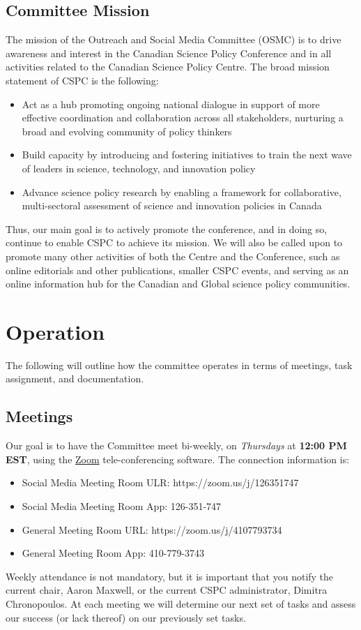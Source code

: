 \documentclass[11pt]{amsart}
\newcommand{\currentChair}{Aaron Maxwell}
\newcommand{\currentAdmin}{Dimitra Chronopoulos}
\begin{document}
\subsection{Committee Mission}
The mission of the Outreach and Social Media Committee (OSMC) is to drive awareness and interest in the Canadian Science Policy Conference and in all activities related to the Canadian Science Policy Centre.
The broad mission statement of CSPC is the following:
\begin{itemize}
\item Act as a hub promoting ongoing national dialogue in support of more effective coordination and collaboration across all stakeholders, nurturing a broad and evolving community of policy thinkers
\item Build capacity by introducing and fostering initiatives to train the next wave of leaders in science, technology, and innovation policy
\item Advance science policy research by enabling a framework for collaborative, multi-sectoral assessment of science and innovation policies in Canada
\end{itemize}
Thus, our main goal is to actively promote the conference, and in doing so, continue to enable CSPC to achieve its mission.
We will also be called upon to promote many other activities of both the Centre and the Conference, such as online editorials and other publications, smaller CSPC events, and serving as an online information hub for the Canadian and Global science policy communities.
\section{Operation}
The following will outline how the committee operates in terms of meetings, task assignment, and documentation.
\subsection{Meetings}
Our goal is to have the Committee meet bi-weekly, on \emph{Thursdays} at \textbf{12:00 PM EST}, using the \href{https://www.zoom.us/}{Zoom} tele-conferencing software.
The connection information is:
\begin{itemize}
\item Social Media Meeting Room ULR: https://zoom.us/j/126351747
\item Social Media Meeting Room App: 126-351-747
\item General Meeting Room URL: https://zoom.us/j/4107793734
\item General Meeting Room App: 410-779-3743
\end{itemize}
Weekly attendance is not mandatory, but it is important that you notify the current chair, \currentChair, or the current CSPC administrator, \currentAdmin.
At each meeting we will determine our next set of tasks and assess our success (or lack thereof) on our previously set tasks.
\end{document}
